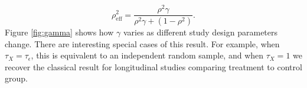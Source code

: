 \documentclass[11pt]{article}
\begin{document}
\begin{multicols}{2}
\begin{equation} \label{eq:rhoeff}
\rho^2_{\mbox{eff}} =\frac{\rho^2\gamma}{\rho^2\gamma+(1-\rho^2)}.
\end{equation}
\noindent Figure \ref{fig:gamma} shows how $\gamma$ varies as different study design parameters change. There are interesting special cases of this result. For example, when $\tau_X = \tau_\epsilon$, this is equivalent to an independent random sample, and when $\tau_X= 1$ we recover the classical result for longitudinal studies comparing treatment to control group.

\end{multicols}
\end{document}
